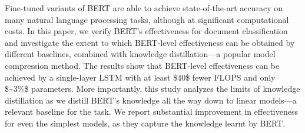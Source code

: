 Fine-tuned variants of BERT are able to achieve state-of-the-art accuracy on many natural language processing tasks, although at significant computational costs. In this paper, we verify BERT's effectiveness for document classification and investigate the extent to which BERT-level effectiveness can be obtained by different baselines, combined with knowledge distillation---a popular model compression method. The results show that BERT-level effectiveness can be achieved by a single-layer LSTM with at least \$40\times\$ fewer FLOPS and only \${\sim}3\%\$ parameters. More importantly, this study analyzes the limits of knowledge distillation as we distill BERT's knowledge all the way down to linear models---a relevant baseline for the task. We report substantial improvement in effectiveness for even the simplest models, as they capture the knowledge learnt by BERT.
